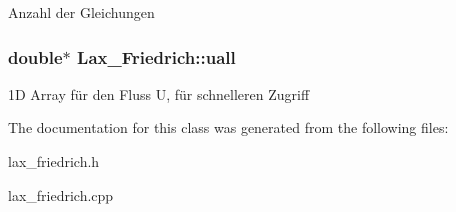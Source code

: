 Anzahl der Gleichungen \hypertarget{classLax__Friedrich_a46da19f1f8569252fde5ab59c357859c}{
\subsubsection[{uall}]{\setlength{\rightskip}{0pt plus 5cm}double$\ast$ Lax\-\_\-\-Friedrich\-::uall\hspace{0.3cm}{\ttfamily [protected]}}}\label{classLax__Friedrich_a46da19f1f8569252fde5ab59c357859c}
1\-D Array für den Fluss U, für schnelleren Zugriff 

The documentation for this class was generated from the following files\-:\begin{DoxyCompactItemize}
\item 
lax\-\_\-friedrich.\-h\item 
lax\-\_\-friedrich.\-cpp\end{DoxyCompactItemize}
